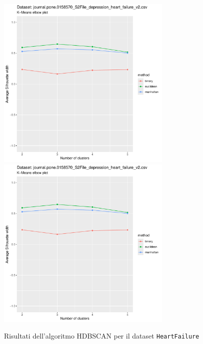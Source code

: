 \documentclass[a4paper, 12pt]{report}
\begin{document}
			\begin{figure}[H]
				\centering
				\includegraphics[width = 0.75\textwidth, height = 0.45\textheight, page = 7]{
					results/results_HeartFailure.csv.pdf
				}
				\includegraphics[width = 0.75\textwidth, height = 0.45\textheight, page = 8]{
					results/results_HeartFailure.csv.pdf
				}
				\caption{Risultati dell'algoritmo HDBSCAN per il dataset
				\texttt{HeartFailure}}
				\label{fig:hdbscan1}
			\end{figure}
\end{document}
